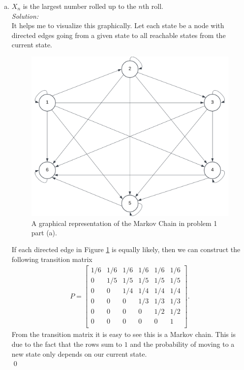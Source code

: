 \documentclass[10pt]{amsart}
\begin{document}
\begin{enumerate}[(a)]
\item $X_n$ is the largest number rolled up to the $n$th roll. \\

\noindent
\textit{Solution:} \\
It helps me to visualize this graphically. 
Let each state be a node with directed edges going from a given state to all reachable states from the current state.
\begin{figure}[h]
	\centering
	\includegraphics[scale=0.5]{one_part_a_markov_graph.png}
	\caption{
		A graphical representation of the Markov Chain in problem 1 part (a).
	}\label{fig:f1}
\end{figure}
If each directed edge in Figure \ref{fig:f1} is equally likely, then we can construct the following transition matrix
\begin{align*}
P = 
\begin{bmatrix}
1 /6 & 1 /6 & 1 /6 & 1 /6 & 1/6 & 1/6 \\
0 & 1/5 & 1/5 & 1/5 & 1/5 & 1 /5 \\
0 & 0 & 1/4 & 1/4 & 1/4 & 1/4 \\
0 & 0 & 0 & 1/3 & 1/3 & 1/3 \\
0 & 0 & 0 & 0 & 1/2 & 1/2 \\
0 & 0 & 0 & 0 & 0 & 1 \\
\end{bmatrix}.
\end{align*}
From the transition matrix it is easy to see this is a Markov chain.
This is due to the fact that the rows sum to $1$ and the probability of moving to a new state only depends on our current state. \\
\qed \\



\end{enumerate}
\end{document}
